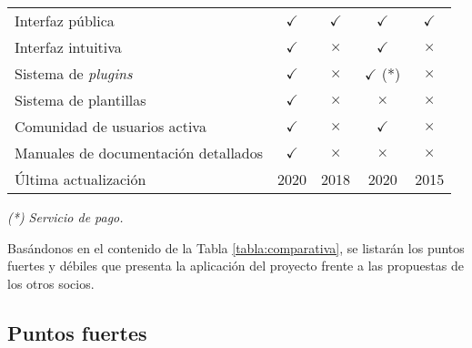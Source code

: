 \begin{table}[H]
\begin{tabular}{@{}lcccc@{}}
Interfaz pública & \cellcolor{green!25} {$\checkmark$} & \cellcolor{green!25} {$\checkmark$} & \cellcolor{green!25} {$\checkmark$} & \cellcolor{green!25} {$\checkmark$}\tabularnewline
Interfaz intuitiva & \cellcolor{green!25} {$\checkmark$} & \cellcolor{red!25} {$\times$} & \cellcolor{green!25} {$\checkmark$} & \cellcolor{red!25} {$\times$}\tabularnewline
Sistema de \emph{plugins} & \cellcolor{green!25} {$\checkmark$} & \cellcolor{red!25} {$\times$} & \cellcolor{green!25} {$\checkmark$} (*) & \cellcolor{red!25} {$\times$}\tabularnewline
Sistema de plantillas & \cellcolor{green!25} {$\checkmark$} & \cellcolor{red!25} {$\times$} & \cellcolor{red!25} {$\times$} & \cellcolor{red!25} {$\times$}\tabularnewline
Comunidad de usuarios activa & \cellcolor{green!25} {$\checkmark$} & \cellcolor{red!25} {$\times$} & \cellcolor{green!25} {$\checkmark$} & \cellcolor{red!25} {$\times$}\tabularnewline
Manuales de documentación detallados & \cellcolor{green!25} {$\checkmark$} & \cellcolor{red!25} {$\times$} & \cellcolor{red!25} {$\times$} & \cellcolor{red!25} {$\times$}\tabularnewline
Última actualización & 2020 & 2018 & 2020 & 2015\tabularnewline
\bottomrule
\end{tabular}
\end{table}

\emph{(*) Servicio de pago.}

Basándonos en el contenido de la Tabla \ref{tabla:comparativa}, se listarán los
puntos fuertes y débiles que presenta la aplicación del proyecto frente
a las propuestas de los otros socios.


\subsection{Puntos fuertes}

